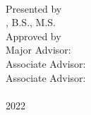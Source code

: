 \begin{center}
    \large\textbf{\dissertationtitle}\\
    Presented by\\
    \myname, B.S., M.S.\\
    \vspace{1.5em}
    Approved by\\
    Major Advisor:	\advisormain \\
    Associate Advisor:  \advisorsub \\
    Associate Advisor:  \advisorsubsub \\
    \vfill
    \mycollege\\
    2022
\end{center}
